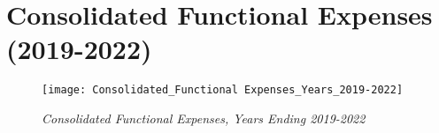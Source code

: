 
\chapter{Consolidated Functional Expenses (2019-2022)}%
\label{ch:consolidated_functional_expenses_2019-2022}

\begin{figure}
  \caption[Consolidated Functional Expenses, Years Ending 2019–2022]{\textit{Consolidated Functional Expenses, Years Ending 2019-2022}}\label{fig:consolidated_functional_expenses_2019-2022} %
    \texttt{[image: Consolidated\_Functional Expenses\_Years\_2019-2022]} %
\end{figure}

